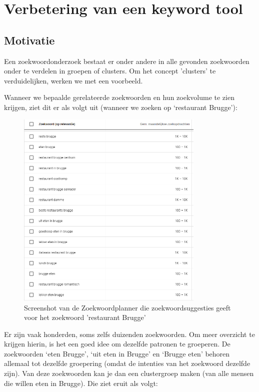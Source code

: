 \chapter{Verbetering van een keyword tool}
\label{ch:tool}

\section{Motivatie}
\label{ch: Motivatie}

Een zoekwoordonderzoek bestaat er onder andere in alle gevonden zoekwoorden onder te verdelen in groepen of clusters. Om het concept  'clusters' te verduidelijken, werken we met een voorbeeld.

Wanneer we bepaalde gerelateerde zoekwoorden en hun zoekvolume te zien krijgen, ziet dit er als volgt uit (wanneer we zoeken op ‘restaurant Brugge’): 

\begin{figure}[h!]
\centering
\includegraphics[width=0.8\textwidth]{img/Keywordplannervoorbeeld.png}
\caption{Screenshot van de Zoekwoordplanner die zoekwoordsuggesties geeft voor het zoekwoord 'restaurant Brugge'}
\end{figure}

Er zijn vaak honderden, soms zelfs duizenden zoekwoorden. Om meer overzicht te krijgen hierin, is het een goed idee om dezelfde patronen te groeperen. De zoekwoorden ‘eten Brugge’, ‘uit eten in Brugge’ en ‘Brugge eten’ behoren allemaal tot dezelfde groepering (omdat de intenties van het zoekwoord dezelfde zijn). Van deze zoekwoorden kan je dan een clustergroep maken (van alle mensen die willen eten in Brugge). Die ziet eruit als volgt:

